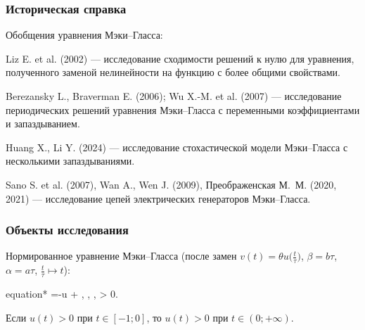 \begin{frame}
	\frametitle{Историческая справка}
	
	Обобщения уравнения Мэки--Гласса:
	
	\smallskip
	
	Liz E. et al. (2002) --- исследование сходимости решений к нулю для уравнения, полученного заменой нелинейности на функцию с более общими свойствами.
	
	\smallskip
	
	Berezansky L., Braverman E. (2006); Wu X.-M. et al. (2007) --- исследование периодических решений уравнения Мэки--Гласса с переменными коэффициентами и запаздыванием.
	
	\smallskip
	
	Huang X., Li Y. (2024) --- исследование стохастической модели Мэки--Гласса с несколькими запаздываниями.
	
	\smallskip
	
	Sano S. et al. (2007), Wan A., Wen J. (2009), Преображенская М.~М. (2020, 2021) --- исследование цепей электрических генераторов Мэки--Гласса.
\end{frame}

\begin{frame}
	\frametitle{Объекты исследования}
	
	Нормированное уравнение Мэки--Гласса (после замен $v(t) = \theta u\Big(\frac{t}{\tau}\Big)$, $\beta = b\tau$, $\alpha=a\tau$, $\frac{t}{\tau} \mapsto t$):
	
	\begin{empheq}[box=\myeq]{equation*}
		=-\beta u + , 
		\quad \alpha, \beta, \gamma > 0.
	\end{empheq}
	
	\bigskip
	
	Если $u(t) > 0$ при $t \in [-1; 0]$, то $u(t) > 0$ при $t \in (0; + \infty)$.
	
%	
%	
\end{frame}

